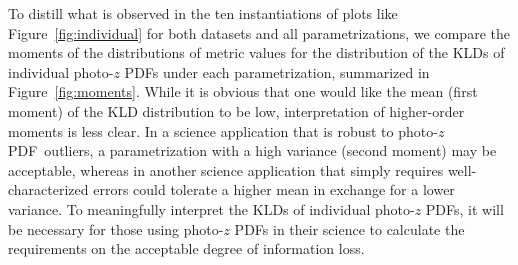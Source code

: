 \documentclass[\docopts]{\docclass}
\newcommand{\pz}{photo-$z$ PDF}
\begin{document}
To distill what is observed in the ten instantiations of plots like 
Figure~\ref{fig:individual} for both datasets and all parametrizations, we 
compare the moments of the distributions of metric values for the distribution 
of the KLDs of individual \pz s under each parametrization, summarized in 
Figure~\ref{fig:moments}.
While it is obvious that one would like the mean (first moment) of the KLD 
distribution to be low, interpretation of higher-order moments is less clear.
In a science application that is robust to \pz\ outliers, a parametrization 
with a high variance (second moment) may be acceptable, whereas in another 
science application that simply requires well-characterized errors could 
tolerate a higher mean in exchange for a lower variance.
To meaningfully interpret the KLDs of individual \pz s, it will be necessary 
for those using \pz s in their science to calculate the requirements on the 
acceptable degree of information loss.
\end{document}
